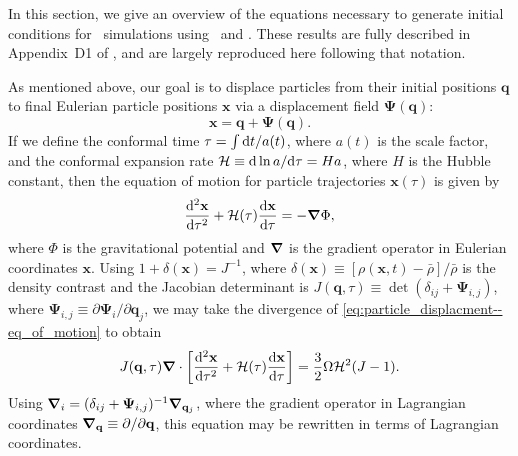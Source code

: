 In this section, we give an overview of the equations necessary to generate initial conditions for \nbody\ simulations using \za\ and \lpt.  These results are fully described in Appendix~D1 of \citet{1998MNRAS.299.1097S}, and are largely reproduced here following that notation.

As mentioned above, our goal is to displace particles from their initial positions $\mathbf{q}$ to final Eulerian particle positions $\mathbf{x}$ via a displacement field $\boldsymbol{\Psi}(\mathbf{q})$:
\begin{equation}
	\mathbf{x} = \mathbf{q} + \boldsymbol{\Psi}(\mathbf{q}).
\end{equation}
If we define the conformal time $\tau = \int {\rm {d}} t / a(t)$, where $a(t)$ is the scale factor, and the conformal expansion rate $\mathcal{H} \equiv {\rm {d}} \ln a/{\rm {d}} \tau = H a$, where $H$ is the Hubble constant, then the equation of motion for particle trajectories $\mathbf{x}(\tau)$ is given by
\begin{equation} \label{eq:particle_displacment--eq_of_motion}
	\frac{{\rm {d}}^{2} \mathbf{x}}{{\rm {d}} \tau^{2}} + \mathcal{H}(\tau) \frac{{\rm {d}} \mathbf{x}}{{\rm {d}} \tau} = -{\boldsymbol{\nabla}} \Phi,
\end{equation}
where $\Phi$ is the gravitational potential and ${\boldsymbol{\nabla}}$ is the gradient operator in Eulerian coordinates $\mathbf{x}$.  Using $1 + \delta(\mathbf{x}) = J^{-1}$, where $\delta(\mathbf{x}) \equiv [\rho(\mathbf{x},t) - \bar{\rho}] / \bar{\rho}$ is the density contrast and the Jacobian determinant is $J(\mathbf{q}, \tau) \equiv \det(\delta_{ij} + \boldsymbol{\Psi}_{i,j})$, where $\boldsymbol{\Psi}_{i,j} \equiv \partial \boldsymbol{\Psi}_{i} / \partial \mathbf{q}_{j}$, we may take the divergence of \ref{eq:particle_displacment--eq_of_motion} to obtain
\begin{equation} \label{eq:particle_displacement--div_eq_of_motion}
	J(\mathbf{q}, \tau) {\boldsymbol{\nabla}} \cdot \left[ \frac{{\rm {d}}^{2} \mathbf{x}}{{\rm {d}} \tau^{2}} + \mathcal{H}(\tau) \frac{{\rm {d}} \mathbf{x}}{{\rm {d}} \tau} \right]
	= \frac{3}{2} \Omega \mathcal{H}^{2}(J - 1).
\end{equation}
Using ${\boldsymbol{\nabla}}_{i} = (\delta_{ij} + \boldsymbol{\Psi}_{i,j})^{-1} {\boldsymbol{\nabla}}_{\mathbf{q}_{j}}$, where the gradient operator in Lagrangian coordinates ${\boldsymbol{\nabla}}_{\mathbf{q}} \equiv \partial / \partial \mathbf{q}$, this equation may be rewritten in terms of Lagrangian coordinates.

